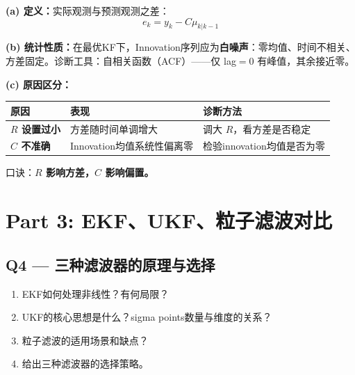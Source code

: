 \documentclass[12pt]{article}
\begin{document}
\begin{tcolorbox}[answerbox]
\textbf{(a) 定义：}实际观测与预测观测之差：
\[
  e_k = y_k - C\mu_{k|k-1}
\]

\textbf{(b) 统计性质：}在最优KF下，Innovation序列应为\textbf{白噪声}：零均值、时间不相关、方差固定。诊断工具：自相关函数（ACF）——仅 lag$=0$ 有峰值，其余接近零。

\textbf{(c) 原因区分：}

\begin{center}
\begin{tabular}{>{\bfseries}p{2.5cm} p{4.5cm} p{4.5cm}}
\toprule
原因 & 表现 & 诊断方法 \\
\midrule
$R$ 设置过小 & 方差随时间单调增大 & 调大 $R$，看方差是否稳定 \\
\addlinespace
$C$ 不准确 & Innovation均值系统性偏离零 & 检验innovation均值是否为零 \\
\bottomrule
\end{tabular}
\end{center}

口诀：\textbf{$R$ 影响方差，$C$ 影响偏置。}
\end{tcolorbox}

\section*{Part 3: EKF、UKF、粒子滤波对比}

\subsection*{Q4 --- 三种滤波器的原理与选择}

\begin{tcolorbox}[questionbox]
\begin{enumerate}[label=(\alph*)]
  \item EKF如何处理非线性？有何局限？
  \item UKF的核心思想是什么？sigma points数量与维度的关系？
  \item 粒子滤波的适用场景和缺点？
  \item 给出三种滤波器的选择策略。
\end{enumerate}
\end{tcolorbox}
\end{document}
